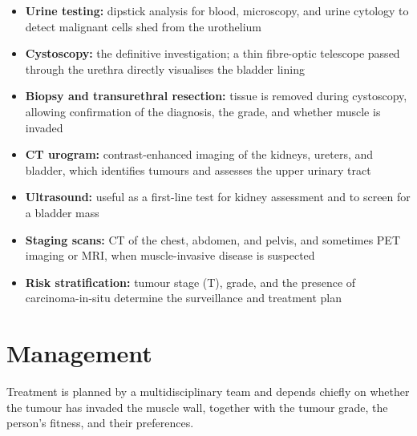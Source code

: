 \begin{itemize}
    \item \textbf{Urine testing:} dipstick analysis for blood, microscopy, and urine cytology to detect malignant cells shed from the urothelium
    \item \textbf{Cystoscopy:} the definitive investigation; a thin fibre-optic telescope passed through the urethra directly visualises the bladder lining
    \item \textbf{Biopsy and transurethral resection:} tissue is removed during cystoscopy, allowing confirmation of the diagnosis, the grade, and whether muscle is invaded
    \item \textbf{CT urogram:} contrast-enhanced imaging of the kidneys, ureters, and bladder, which identifies tumours and assesses the upper urinary tract
    \item \textbf{Ultrasound:} useful as a first-line test for kidney assessment and to screen for a bladder mass
    \item \textbf{Staging scans:} CT of the chest, abdomen, and pelvis, and sometimes PET imaging or MRI, when muscle-invasive disease is suspected
    \item \textbf{Risk stratification:} tumour stage (T), grade, and the presence of carcinoma-in-situ determine the surveillance and treatment plan
\end{itemize}

\section*{Management}
Treatment is planned by a multidisciplinary team and depends chiefly on whether the tumour has invaded the muscle wall, together with the tumour grade, the person's fitness, and their preferences.

